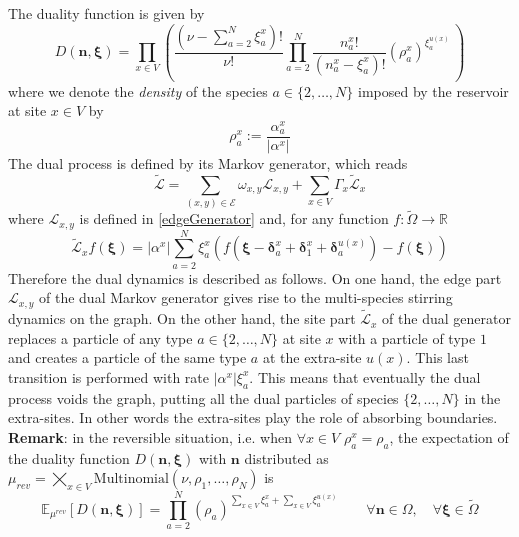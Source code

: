 \documentclass[10pt]{article}
\numberwithin{equation}{section}
\numberwithin{equation}{subsection}
\newcommand{\twoj}{\nu}
\begin{document}
The duality function is given by
\begin{equation}\label{dualityElements}
	D(\bm{n},\bm{\xi})=\prod_{x\in V}\left(\frac{(\nu -\sum_{a=2}^{N}\xi_{a}^{x})!}{\nu!}\prod_{a=2}^{N}\frac{n_{a}^{x}!}{(n_{a}^{x}-\xi_{a}^{x})!}\left(\rho_{a}^{x}\right)^{\xi_{a}^{u(x)}}\,\right)
\end{equation}
where we denote the \textit{density} of the species $a\in \{2,\ldots,N\}$ imposed by the reservoir at site $x\in V$  by 
\begin{equation}
\rho_{a}^{x}:=\frac{\alpha_{a}^{x}}{|\alpha^{x}|}
\end{equation}
The dual process is defined by its Markov generator, which reads
 \begin{equation}\label{DualGenerator}
    \widetilde{\mathcal{L}}=\sum_{(x,y)\in \mathcal{E}}\omega_{x,y}\mathcal{L}_{x,y}+\sum_{x\in V}\Gamma_{x}\widetilde{\mathcal{L}}_{x}
\end{equation}
where 
$\mathcal{L}_{x,y}$ is defined in \eqref{edgeGenerator} and, for any function $f:\widetilde{\Omega}\to \mathbb{R}$ 
\begin{equation}\label{siteDualGenerator}
    \widetilde{\mathcal{L}}_{x}f(\bm{\xi})=|\alpha^{x}|\sum_{a=2}^{N}\xi_{a}^{x}\left(f(\bm{\xi}-\bm{\delta}_{a}^{x}+\bm{\delta}_{1}^{x}+\bm{\delta}_{a}^{u(x)})-f(\bm{\xi})\right)
\end{equation}
\newline
Therefore the dual dynamics is described as follows. On one hand, the edge part $\mathcal{L}_{x,y}$ of the dual Markov generator gives rise to  the multi-species stirring dynamics on the graph. On the other hand, the site
part $\widetilde{\mathcal{L}}_{x}$ of the dual generator replaces a particle of any type $a\in\{2,\ldots,N\}$ at site $x$ with a particle of type $1$ and creates a particle of the same type $a$ at the extra-site $u(x)$. This last transition is performed with rate $|\alpha^{x}|\xi_{a}^{x}$. This means that eventually the dual process voids the graph, putting all the dual particles of species $\{2,\ldots,N\}$ in the extra-sites. In other words the extra-sites play the role of absorbing boundaries. 
\newline \newline
\textbf{Remark}: in the reversible situation, i.e. when $\forall x\in V$ $\rho_{a}^{x}=\rho_{a}$, the expectation  of the duality function  $D(\bm{n},\bm{\xi})$ with   $\bm{n}$ distributed as  $\mu_{rev} = \bigtimes_{x\in V}\text{Multinomial}\left(\twoj, \rho_{1},\ldots,\rho_{N}\right)$ is
\begin{equation}
\mathbb{E}_{\mu^{rev}}\left[D(\bm{n},\bm{\xi})\right]=\prod_{a=2}^{N}\left(\rho_{a}\right)^{\sum_{x\in V}\xi_{a}^{x}+\sum_{x\in V}\xi_{a}^{u(x)}}\qquad \forall \bm{n}\in \Omega,\quad\forall \bm{\xi}\in \widetilde{\Omega}
\end{equation}
\end{document}
